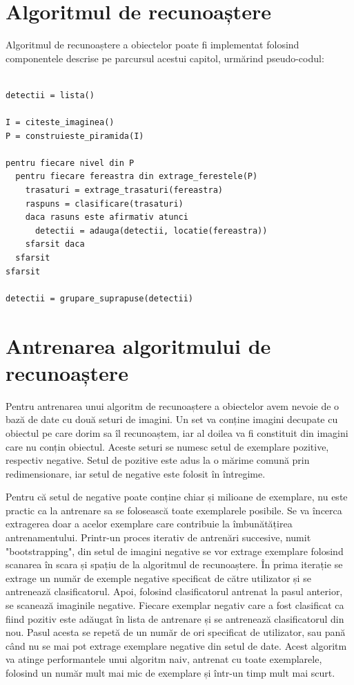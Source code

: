 \pagebreak
\section{Algoritmul de recunoaștere}

Algoritmul de recunoaștere a obiectelor poate fi implementat folosind componentele descrise pe parcursul acestui capitol, urmărind pseudo-codul:
\begin{mdframed}
\begin{verbatim}

detectii = lista()

I = citeste_imaginea()
P = construieste_piramida(I)

pentru fiecare nivel din P
  pentru fiecare fereastra din extrage_ferestele(P)
    trasaturi = extrage_trasaturi(fereastra)
    raspuns = clasificare(trasaturi)
    daca rasuns este afirmativ atunci
      detectii = adauga(detectii, locatie(fereastra))
    sfarsit daca
  sfarsit
sfarsit

detectii = grupare_suprapuse(detectii)

\end{verbatim}
\end{mdframed}

\section{Antrenarea algoritmului de recunoaștere}

Pentru antrenarea unui algoritm de recunoaștere a obiectelor avem nevoie de o bază de date cu două seturi de imagini.
Un set va conține imagini decupate cu obiectul pe care dorim sa îl recunoaștem, iar al doilea va fi constituit din imagini care nu conțin obiectul.
Aceste seturi se numesc setul de exemplare pozitive, respectiv negative.
Setul de pozitive este adus la o mărime comună prin redimensionare, iar setul de negative este folosit în întregime.

Pentru că setul de negative poate conține chiar și milioane de exemplare, nu este practic ca la antrenare sa se folosească toate exemplarele posibile.
Se va încerca extragerea doar a acelor exemplare care contribuie la îmbunătățirea antrenamentului.
Printr-un proces iterativ de antrenări succesive, numit "bootstrapping", din setul de imagini negative se vor extrage exemplare folosind scanarea în scara și spațiu de la algoritmul de recunoaștere.
În prima iterație se extrage un număr de exemple negative specificat de către utilizator și se antrenează clasificatorul.
Apoi, folosind clasificatorul antrenat la pasul anterior, se scanează imaginile negative.
Fiecare exemplar negativ care a fost clasificat ca fiind pozitiv este adăugat în lista de antrenare și se antrenează clasificatorul din nou.
Pasul acesta se repetă de un număr de ori specificat de utilizator, sau pană când nu se mai pot extrage exemplare negative din setul de date.
Acest algoritm va atinge performantele unui algoritm naiv, antrenat cu toate exemplarele, folosind un număr mult mai mic de exemplare și într-un timp mult mai scurt.

